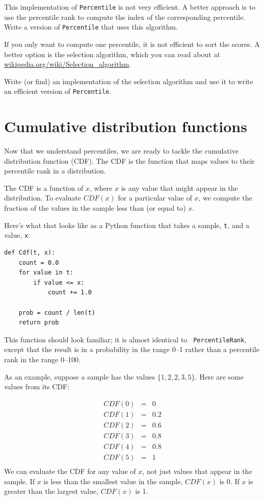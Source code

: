 \documentclass[12pt]{book}
\begin{document}
\begin{ex}
This implementation of {\tt Percentile} is not very efficient.  A
better approach is to use the percentile rank to compute the index of
the corresponding percentile.  Write a version of {\tt Percentile} that
uses this algorithm.
\end{ex}

\begin{ex}

If you only want to compute one percentile, it is not efficient
to sort the scores.  A better option is the selection algorithm,
which you can read about at \url{wikipedia.org/wiki/Selection_algorithm}.

Write (or find) an implementation of the selection algorithm and use
it to write an efficient version of {\tt Percentile}.

\end{ex}


\section{Cumulative distribution functions}

Now that we understand percentiles, we are ready to tackle the
cumulative distribution function (CDF).  The CDF is the function that
maps values to their percentile rank in a distribution.

The CDF is a function of $x$, where $x$ is any value that might appear
in the distribution.  To evaluate $CDF(x)$ for a particular value of
$x$, we compute the fraction of the values in the sample less than (or
equal to) $x$.

Here's what that looks like as a Python function that takes a sample,
{\tt t}, and a value, {\tt x}:

\begin{verbatim}
def Cdf(t, x):
    count = 0.0
    for value in t:
        if value <= x:
            count += 1.0

    prob = count / len(t)
    return prob
\end{verbatim}

This function should look familiar; it is almost identical to {\tt
  PercentileRank}, except that the result is in a probability in the
range 0--1 rather than a percentile rank in the range 0--100.

As an example, suppose a sample has the values $\{1, 2, 2, 3, 5\}$.
Here are some values from its CDF:

\begin{eqnarray*}
CDF(0) &=& 0    \\
CDF(1) &=& 0.2    \\
CDF(2) &=& 0.6    \\
CDF(3) &=& 0.8    \\
CDF(4) &=& 0.8    \\
CDF(5) &=& 1    \\
\end{eqnarray*}
%
We can evaluate the CDF for any value of $x$, not just
values that appear in the sample.
If $x$ is less than the smallest value in the sample, $CDF(x)$ is 0.
If $x$ is greater than the largest value, $CDF(x)$ is 1.
\end{document}
